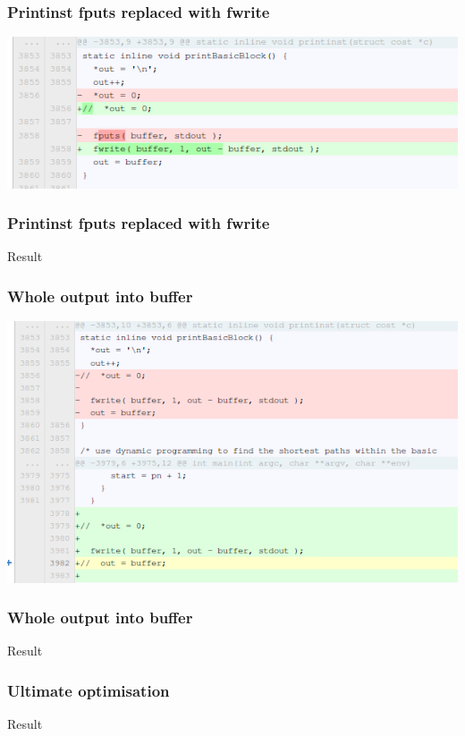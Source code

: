 \documentclass{beamer}
\begin{document}
\begin{frame}\frametitle{Printinst fputs replaced with fwrite}
\begin{center}
\includegraphics[scale=0.4]{shots/printinst4.png}
\end{center}
\end{frame}

\begin{frame}\frametitle{Printinst fputs replaced with fwrite}
\begin{center}
Result
\end{center}
\end{frame}

\begin{frame}\frametitle{Whole output into buffer}
\begin{center}
\includegraphics[scale=0.4]{shots/outputbuffer.png}
\end{center}
\end{frame}

\begin{frame}\frametitle{Whole output into buffer}
\begin{center}
Result
\end{center}
\end{frame}

\begin{frame}\frametitle{Ultimate optimisation}
\begin{center}
Result
\end{center}
\end{frame}
\end{document}
